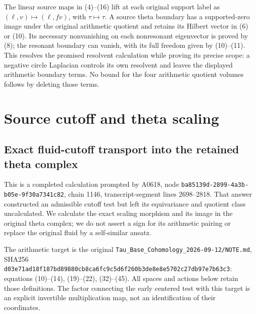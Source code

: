\documentclass[10pt,a4paper,oneside]{report}
\begin{document}
The linear source maps in (4)--(16) lift at each original support
label as \((\ell,v)\mapsto(\ell,fv)\), with
\(\tau\mapsto\tau\). A source theta boundary has a supported-zero
image under the original arithmetic quotient and retains its
Hilbert vector in (6) or (10). Its necessary nonvanishing on each
nonresonant eigenvector is proved by (8); the resonant boundary can
vanish, with its full freedom given by (10)--(11). This resolves the promised
resolvent calculation while proving its precise scope: a negative
circle Laplacian controls its own resolvent and leaves the displayed
arithmetic boundary terms. No bound for the four arithmetic quotient
volumes follows by deleting those terms.
\endgroup


\endgroup
\clearpage
\chapter{Source cutoff and theta scaling}
\begingroup
\section{Exact fluid-cutoff transport into the retained theta
complex}\label{proof09:exact-fluid-cutoff-transport-into-the-retained-theta-complex}

This is a completed calculation prompted by A0618, node
\texttt{ba85139d-\allowbreak{}2899-\allowbreak{}4a3b-\allowbreak{}b05e-\allowbreak{}9f30a7341c82}, chain 1146,
transcript-segment lines 2698--2818. That answer constructed an
admissible cutoff test but left its equivariance and quotient class
uncalculated. We calculate the exact scaling morphism and its image in
the original theta complex; we do not assert a sign for its arithmetic
pairing or replace the original fluid by a self-similar ansatz.

The arithmetic target is the original
\texttt{Tau\_\allowbreak{}Base\_\allowbreak{}Cohomology\_\allowbreak{}2026-\allowbreak{}09-\allowbreak{}12/\allowbreak{}NOTE.md}, SHA256
\texttt{d03e71ad\allowbreak{}18f187bd\allowbreak{}89880cb8\allowbreak{}ca6fc9c5\allowbreak{}d6f260b3\allowbreak{}de8e8e57\allowbreak{}02c27db9\allowbreak{}7e7b63c3}:
equations (10)--(14), (19)--(22), (32)--(45). All spaces and actions
below retain those definitions. The factor connecting the early centered
test with this target is an explicit invertible multiplication map, not
an identification of their coordinates.
\end{document}
